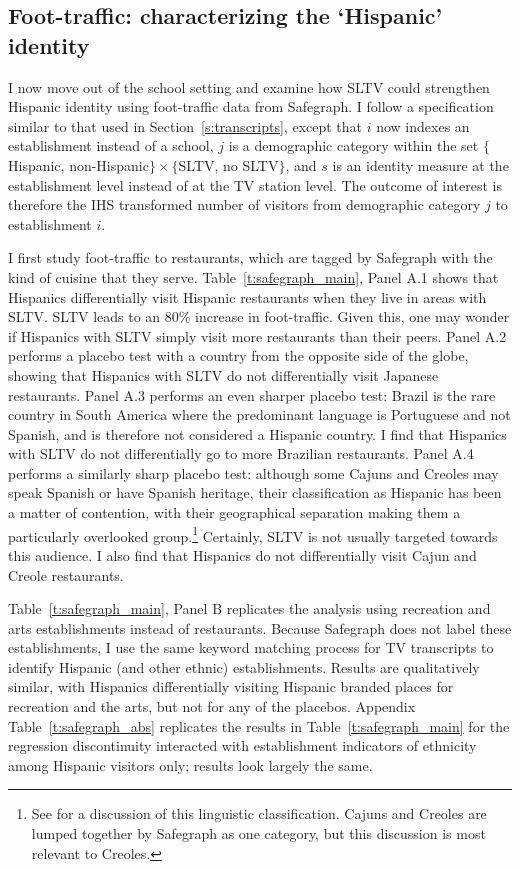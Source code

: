\documentclass[11pt]{article}
\begin{document}
\subsection{Foot-traffic: characterizing the `Hispanic' identity}\label{s:safegraph}

I now move out of the school setting and examine how SLTV could strengthen Hispanic identity using foot-traffic data from Safegraph. I follow a specification similar to that used in Section~\ref{s:transcripts}, except that $i$ now indexes an establishment instead of a school, $j$ is a demographic category within the set $\{$Hispanic, non-Hispanic$\} \times  \{$SLTV, no SLTV$\}$, and $s$ is an identity measure at the establishment level instead of at the TV station level. The outcome of interest is therefore the IHS transformed number of visitors from demographic category $j$ to establishment $i$.

I first study foot-traffic to restaurants, which are tagged by Safegraph with the kind of cuisine that they serve. Table~\ref{t:safegraph_main}, Panel A.1 shows that Hispanics differentially visit Hispanic restaurants when they live in areas with SLTV. SLTV leads to an 80\% increase in foot-traffic. Given this, one may wonder if Hispanics with SLTV simply visit more restaurants than their peers. Panel A.2 performs a placebo test with a country from the opposite side of the globe, showing that Hispanics with SLTV do not differentially visit Japanese restaurants. Panel A.3 performs an even sharper placebo test: Brazil is the rare country in South America where the predominant language is Portuguese and not Spanish, and is therefore not considered a Hispanic country. I find that Hispanics with SLTV do not differentially go to more Brazilian restaurants. Panel A.4 performs a similarly sharp placebo test: although some Cajuns and Creoles may speak Spanish or have Spanish heritage, their classification as Hispanic has been a matter of contention, with their geographical separation making them a particularly overlooked group.\footnote{ See \cite{schwegler2010pidgin} for a discussion of this linguistic classification. Cajuns and Creoles are lumped together by Safegraph as one category, but this discussion is most relevant to Creoles.} Certainly, SLTV is not usually targeted towards this audience. I also find that Hispanics do not differentially visit Cajun and Creole restaurants. 

Table~\ref{t:safegraph_main}, Panel B replicates the analysis using recreation and arts establishments instead of restaurants. Because Safegraph does not label these establishments, I use the same keyword matching process for TV transcripts to identify Hispanic (and other ethnic) establishments. Results are qualitatively similar, with Hispanics differentially visiting Hispanic branded places for recreation and the arts, but not for any of the placebos. Appendix Table~\ref{t:safegraph_abs} replicates the results in Table~\ref{t:safegraph_main} for the regression discontinuity interacted with establishment indicators of ethnicity among Hispanic visitors only; results look largely the same. 
\end{document}
